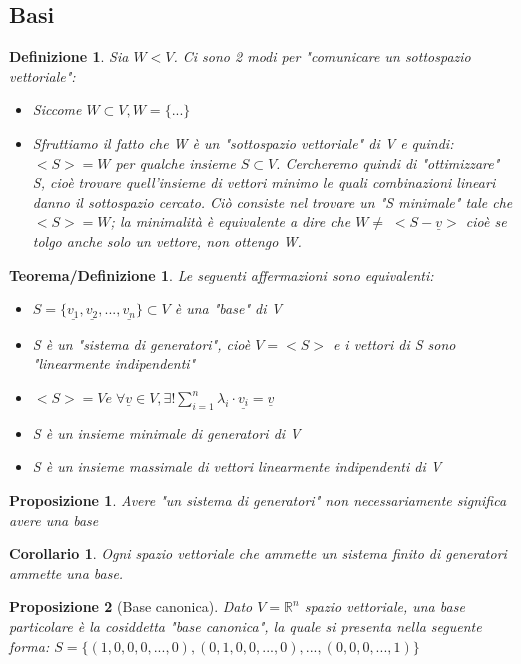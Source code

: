 \documentclass[12pt]{article}
\newenvironment{para}{\begin{adjustwidth}{13mm}{}}{\end{adjustwidth}}
\newtheorem{Definizione}{Definizione}[subsection]
\newtheorem{Teorema/Definizione}{Teorema/Definizione}[subsection]
\newtheorem{Corollario}{Corollario}[subsection]
\newtheorem{Proposizione}{Proposizione}[subsection]
\begin{document}
\begin{para}
\section{Basi}
\begin{Definizione}
Sia $W < V$. Ci sono 2 modi per "comunicare un sottospazio vettoriale":
\begin{itemize}
    \item Siccome $W \subset V, W = \{...\}$
    \item Sfruttiamo il fatto che W è un "sottospazio vettoriale" di V e quindi: \newline $<S> = W$ per qualche insieme $S \subset V$. Cercheremo quindi di "ottimizzare" S, cioè trovare quell'insieme di vettori minimo le quali combinazioni lineari danno il sottospazio cercato. Ciò consiste nel trovare un "S minimale" tale che $<S> = W$; la minimalità è equivalente a dire che $W \neq \; <S-\underline{v}>$ cioè se tolgo anche solo un vettore, non ottengo W.
\end{itemize}
\end{Definizione}
\begin{Teorema/Definizione}
Le seguenti affermazioni sono equivalenti:
\begin{itemize}
    \item $S = \{\underline{v_1}, \underline{v_2}, ..., \underline{v_n} \} \subset V$ è una "base" di V
    \item S è un "sistema di generatori", cioè $V = <S>$ e i vettori di S sono "linearmente indipendenti"
    \item $<S> = V e \; \forall\underline{v}\in V, \exists! \sum_{i = 1}^{n} \lambda_i \cdot \underline{v_i} = \underline{v}$
    \item S è un insieme minimale di generatori di V
    \item S è un insieme massimale di vettori linearmente indipendenti di V
\end{itemize}
\end{Teorema/Definizione}
\begin{Proposizione}
    Avere "un sistema di generatori" non necessariamente significa avere una base
\end{Proposizione}
\begin{Corollario}
Ogni spazio vettoriale che ammette un sistema finito di generatori ammette una base.
\end{Corollario}

\begin{Proposizione}[Base canonica]
Dato $V = \mathbb{R}^n$ spazio vettoriale, una base particolare è la cosiddetta "base canonica", la quale si presenta nella seguente forma: $S = \{(1,0,0,0,...,0),(0,1,0,0,...,0), ..., (0,0,0,...,1)\}$
\end{Proposizione}


\end{para}
\end{document}
